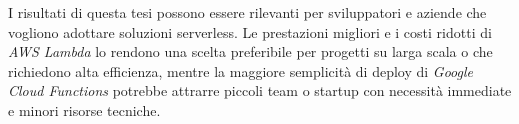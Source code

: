I risultati di questa tesi possono essere rilevanti per sviluppatori e aziende che vogliono adottare soluzioni serverless. Le prestazioni migliori e i costi ridotti di \textit{AWS Lambda} lo rendono una scelta preferibile per progetti su larga scala o che richiedono alta efficienza, mentre la maggiore semplicità di deploy di \textit{Google Cloud Functions} potrebbe attrarre piccoli team o startup con necessità immediate e minori risorse tecniche.